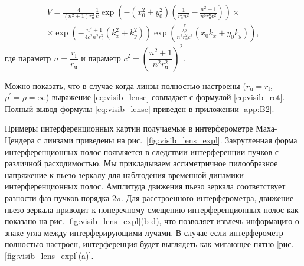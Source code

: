 \begin{equation}
\begin{split}
    V =\frac{4}{\left(n^{2}+1\right) r_{\mathrm{u}}^{2}} \frac{1}{c} \exp \left(-\left(x_{0}^{2}+y_{0}^{2}\right)\left(\frac{1}{r_{\mathrm{u}}^{2} n^{2}}-\frac{n^{2}+1}{n^{6} r_{\mathrm{u}}^{6} c^{2}}\right)\right) \times \\ \times \exp \left(-\frac{n^{2}+1}{4 c^{2} n^{2} r_{\mathrm{u}}^{2}}\left(k_{x}^{2}+k_{y}^{2}\right)\right) \exp \left(\frac{\frac{\pi}{\lambda \rho^{\prime}}}{n^{2} r_{\mathrm{u}}^{2} c^{2}}\left(x_{0} k_{x}+y_{0} k_{y}\right)\right),
\end{split}
\label{eq:visib_lense}
\end{equation}
где параметр $n=\dfrac{r_{\mathrm{l}}}{r_{\mathrm{u}}}$ и параметр $c^2 = (\dfrac{n^2 + 1}{n^2r^2_{\mathrm{u}}})^2$.

Можно показать, что в случае когда линзы полностью настроены ($r_{\mathrm{u}} = r_{\mathrm{l}}$, $\rho^{\prime} = \rho = \infty$) выражение \eqref{eq:visib_lense} совпадает с формулой \eqref{eq:visib_rot}. Полный вывод формулы \eqref{eq:visib_lense} приведен в приложении \ref{app:B2}.

Примеры интерференционных картин получаемые в интерферометре Маха-Цендера с линзами приведены на рис.~\ref{fig:visib_lens_expl}. Закругленная форма интерференционных полос появляется в следствии интерференции пучков с различной расходимостью. Мы прикладываем ассиметричное пилообразное напряжение к пьезо зеркалу для наблюдения временной динамики интерференционных полос. Амплитуда движения пьезо зеркала соответствует разности фаз пучков порядка $2\pi$. Для расстроенного интерферометра, движение пьезо зеркала приводит к поперечному смещению интерференционных полос как показано на рис. \ref{fig:visib_lens_expl}(b-d), что позволяет извлечь информацию о знаке угла между интерферирующими лучами. В случае если интерферометр полностью настроен, интерференция будет выглядеть как мигающее пятно [рис. \ref{fig:visib_lens_expl}(a)].

